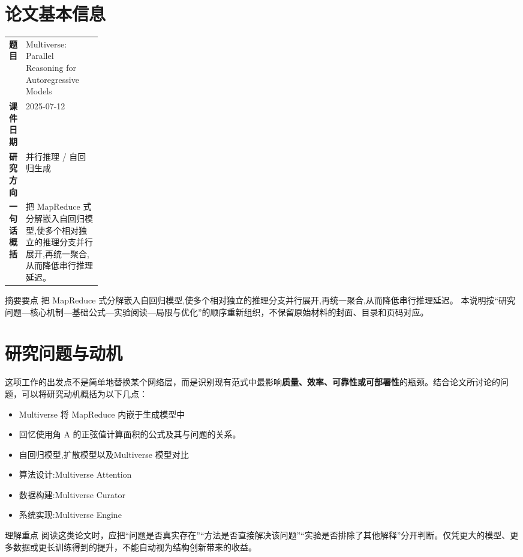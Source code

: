 \documentclass[UTF8,11pt,a4paper]{ctexart}
\newcommand{\term}[1]{\textbf{\textcolor{mainblue}{#1}}}
\begin{document}
\section{论文基本信息}
\begin{center}
\begin{tabularx}{0.94\linewidth}{>{\bfseries}p{0.18\linewidth}X}
\toprule
题目 & Multiverse: Parallel Reasoning for Autoregressive Models\\
课件日期 & 2025-07-12\\
研究方向 & 并行推理 / 自回归生成\\
一句话概括 & 把 MapReduce 式分解嵌入自回归模型,使多个相对独立的推理分支并行展开,再统一聚合,从而降低串行推理延迟。\\
\bottomrule
\end{tabularx}
\end{center}

\begin{infobox}{摘要要点}
把 MapReduce 式分解嵌入自回归模型,使多个相对独立的推理分支并行展开,再统一聚合,从而降低串行推理延迟。 本说明按“研究问题—核心机制—基础公式—实验阅读—局限与优化”的顺序重新组织，不保留原始材料的封面、目录和页码对应。
\end{infobox}

\section{研究问题与动机}
这项工作的出发点不是简单地替换某个网络层，而是识别现有范式中最影响\term{质量、效率、可靠性或可部署性}的瓶颈。结合论文所讨论的问题，可以将研究动机概括为以下几点：
\begin{itemize}
\item Multiverse 将 MapReduce 内嵌于生成模型中
\item 回忆使用角 A 的正弦值计算面积的公式及其与问题的关系。
\item 自回归模型,扩散模型以及Multiverse 模型对比
\item 算法设计:Multiverse Attention
\item 数据构建:Multiverse Curator
\item 系统实现:Multiverse Engine
\end{itemize}

\begin{notebox}{理解重点}
阅读这类论文时，应把“问题是否真实存在”“方法是否直接解决该问题”“实验是否排除了其他解释”分开判断。仅凭更大的模型、更多数据或更长训练得到的提升，不能自动视为结构创新带来的收益。
\end{notebox}
\end{document}

